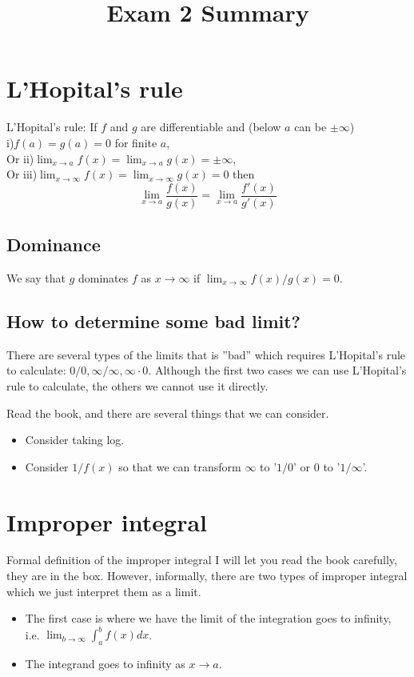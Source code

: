 \documentclass[12pt]{article}
\date{}
\title{Exam 2 Summary}
\theoremstyle{definition}
\theoremstyle{definition}
\theoremstyle{remark}
\theoremstyle{definition}
\theoremstyle{definition}
\theoremstyle{definition}
\begin{document}
\maketitle
\section{L'Hopital's rule}

L’Hopital’s rule: If $f$ and $g$ are differentiable and (below $a$ can be $\pm \infty$)\\
i)$f(a) = g(a) = 0$ for finite $a$, \\
Or ii)$\lim_{x\to a} f(x)=\lim_{x\to a} g(x)= \pm \infty$,\\ 
Or iii)$\lim_{x\to \infty} f(x)= \lim_{x\to \infty} g(x) = 0$
then 
\[\lim_{x\to a}\frac{f(x)}{g(x)} = \lim_{x\to a} \frac{f'(x)}{g'(x)} \]

\subsection{Dominance}
We say that $g$ dominates $f$ as $x \to \infty$ if $\lim_{x\to \infty}f(x)/g(x) = 0$. 
\subsection{How to determine some bad limit?}

There are several types of the limits that is ''bad'' which requires L'Hopital's rule to calculate:
$0/0, \infty/\infty, \infty\cdot0$. Although the first two cases we can use L'Hopital's rule to calculate, the others we cannot use it directly.

Read the book, and there are several things that we can consider.
\begin{itemize}
	\item Consider taking log.
	\item Consider $1/f(x)$ so that we can transform $\infty$ to '$1/0$' or $0$ to '$1/\infty$'.
\end{itemize}

\section{Improper integral}
Formal definition of the improper integral I will let you read the book carefully, they are in the box. 
However, informally, there are two types of improper integral which we just interpret them as a limit.

\begin{itemize}
	\item The first case is where we have the limit of the integration goes to infinity, i.e. $\lim_{b \to \infty} \int^b_a f(x) dx$.
	\item The integrand goes to infinity as $x \to a$.
\end{itemize}
\end{document}
